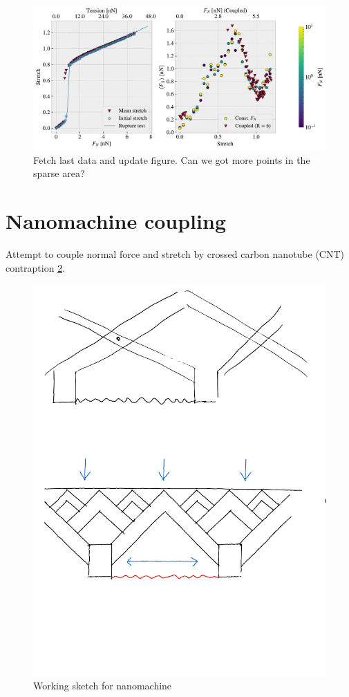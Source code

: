 \begin{figure}[H]
  \centering
  \includegraphics[width=0.9\linewidth]{figures/negative_coefficient/manual_coupling_free_hon3215.pdf}
  \caption{Fetch last data and update figure. Can we got more points in the sparse area?}
  \label{fig:nanomachine}
\end{figure}





\section{Nanomachine coupling}
Attempt to couple normal force and stretch by crossed carbon nanotube (CNT) contraption \ref{fig:nanomachine}. 


\begin{figure}[H]
  \centering
  \includegraphics[width=0.5\linewidth]{figures/negative_coefficient/nanomachine.pdf}
  \caption{Working sketch for nanomachine}
  \label{fig:nanomachine}
\end{figure}



